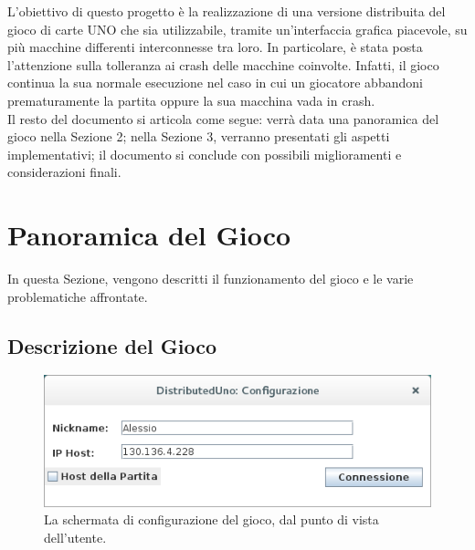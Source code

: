 \documentclass[11pt]{article} %
\begin{document}
L'obiettivo di questo progetto è la realizzazione di una versione distribuita del gioco di carte UNO che sia utilizzabile, tramite un'interfaccia grafica 
piacevole, su più macchine differenti interconnesse tra loro. In particolare, è stata posta l'attenzione sulla tolleranza ai crash delle macchine coinvolte.
Infatti, il gioco continua la sua normale esecuzione nel caso in cui un giocatore abbandoni prematuramente la partita oppure la sua macchina vada in crash.\\
Il resto del documento si articola come segue: verrà data una panoramica del gioco nella Sezione 2; nella Sezione 3, verranno presentati gli aspetti implementativi;
il documento si conclude con possibili miglioramenti e considerazioni finali.

\section{Panoramica del Gioco}
In questa Sezione, vengono descritti il funzionamento del gioco e le varie problematiche affrontate.

\subsection{Descrizione del Gioco}

\begin{figure}[h]
\centering%
\includegraphics[width=12cm, keepaspectratio]{configScreen1.png}%
\caption{La schermata di configurazione del gioco, dal punto di vista dell'utente.}
\end{figure}
\end{document}

